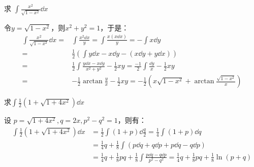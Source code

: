 \begin{example}
求 $\int \frac{x^2}{\sqrt{1 - x^2}} \dd x$
\end{example}
\begin{solution}
令$y=\sqrt{1-x^2}$，则$x^2+y^2=1$，于是：
\begin{align*}
\int \frac{x^2}{\sqrt{1 - x^2}} \dd x=&\int\frac{x^2\dd x}{y}=\int\frac{x(x\dd x)}{y}=-\int x\dd y\\
=&\frac12\left(\int y\dd x-x\dd y-(x\dd y+y\dd x)\right)\\
=&\frac12\int\frac{y\dd x-x\dd y}{x^2+y^2}-\frac12xy=\frac{-1}2\int\frac{\dd y}{x}-\frac12xy\\
=&-\frac12\arctan\frac{y}{x}-\frac12xy=- \frac{1}{2} \left( x \sqrt{1 - x^2} + \arctan \frac{\sqrt{1 - x^2}}{x} \right)
\end{align*}
\end{solution}

\begin{example}
求$\displaystyle\int\frac{1}{2} \left( 1 + \sqrt{1 + 4x^2} \right)\dd x$
\end{example}
\begin{solution}
设 $p = \sqrt{1 + 4x^2}, q = 2x,p^2-q^2=1$，则有：
\begin{align*}
    \int\frac{1}{2} \left( 1 + \sqrt{1 + 4x^2} \right)\dd x&=\frac12\int(1+p)\dd\frac{q}{2}=\frac14\int(1+p)\dd q\\
    &=\frac14q+\frac18\int\left(p\dd q+q\dd p+p\dd q-q\dd p\right)\\
    &=\frac14q+\frac18pq+\frac18\int\frac{p\dd q-q\dd p}{p^2-q^2}=\frac14q+\frac18pq+\frac18\ln(p+q)\\
\end{align*}
\end{solution}

